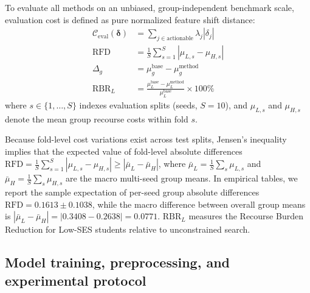 \documentclass[11pt]{article}
\begin{document}
To evaluate all methods on an unbiased, group-independent benchmark scale, evaluation cost is defined as pure normalized feature shift distance:
\begin{align}
\mathcal{C}_{\text{eval}}(\boldsymbol{\delta}) &= \sum_{j \in \text{actionable}} \lambda_j |\delta_j| \\
\text{RFD} &= \frac{1}{S} \sum_{s=1}^{S} |\mu_{L,s} - \mu_{H,s}| \\
\Delta_g &= \mu_g^{\text{base}} - \mu_g^{\text{method}} \\
\text{RBR}_L &= \frac{\mu_L^{\text{base}} - \mu_L^{\text{method}}}{\mu_L^{\text{base}}} \times 100\%
\end{align}
where $s \in \{1, \dots, S\}$ indexes evaluation splits (seeds, $S=10$), and $\mu_{L,s}$ and $\mu_{H,s}$ denote the mean group recourse costs within fold $s$. 

Because fold-level cost variations exist across test splits, Jensen's inequality implies that the expected value of fold-level absolute differences $\text{RFD} = \frac{1}{S}\sum_{s=1}^S |\mu_{L,s} - \mu_{H,s}| \ge |\bar{\mu}_L - \bar{\mu}_H|$, where $\bar{\mu}_L = \frac{1}{S}\sum_s \mu_{L,s}$ and $\bar{\mu}_H = \frac{1}{S}\sum_s \mu_{H,s}$ are the macro multi-seed group means. In empirical tables, we report the sample expectation of per-seed group absolute differences $\text{RFD} = 0.1613 \pm 0.1038$, while the macro difference between overall group means is $|\bar{\mu}_L - \bar{\mu}_H| = |0.3408 - 0.2638| = 0.0771$. $\text{RBR}_L$ measures the Recourse Burden Reduction for Low-SES students relative to unconstrained search.

\subsection{Model training, preprocessing, and experimental protocol}
\label{subsec:exp_protocol}
\end{document}
